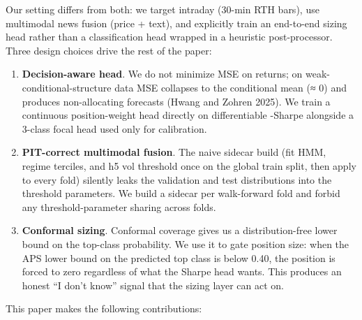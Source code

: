 \documentclass[
]{article}
\begin{document}
Our setting differs from both: we target intraday (30-min RTH bars), use
multimodal news fusion (price + text), and explicitly train an
end-to-end sizing head rather than a classification head wrapped in a
heuristic post-processor. Three design choices drive the rest of the
paper:

\begin{enumerate}
\def\labelenumi{\arabic{enumi}.}
\item
  \textbf{Decision-aware head}. We do not minimize MSE on returns; on
  weak-conditional-structure data MSE collapses to the conditional mean
  (≈ 0) and produces non-allocating forecasts (Hwang and Zohren 2025).
  We train a continuous position-weight head directly on differentiable
  -Sharpe alongside a 3-class focal head used only for calibration.
\item
  \textbf{PIT-correct multimodal fusion}. The naive sidecar build (fit
  HMM, regime terciles, and h5 vol threshold once on the global train
  split, then apply to every fold) silently leaks the validation and
  test distributions into the threshold parameters. We build a sidecar
  per walk-forward fold and forbid any threshold-parameter sharing
  across folds.
\item
  \textbf{Conformal sizing}. Conformal coverage gives us a
  distribution-free lower bound on the top-class probability. We use it
  to gate position size: when the APS lower bound on the predicted top
  class is below 0.40, the position is forced to zero regardless of what
  the Sharpe head wants. This produces an honest ``I don't know'' signal
  that the sizing layer can act on.
\end{enumerate}

This paper makes the following contributions:
\end{document}
